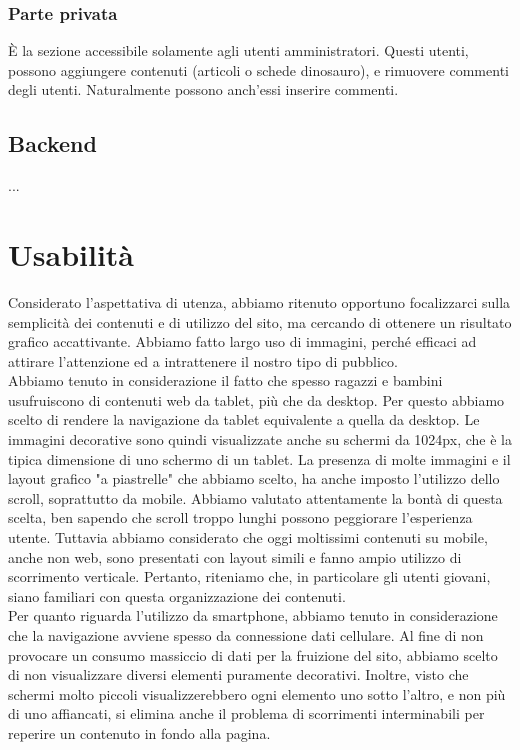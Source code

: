 \documentclass[12pt]{article}
\begin{document}
	\subsubsection{Parte privata}
	È la sezione accessibile solamente agli utenti amministratori. Questi utenti, possono aggiungere contenuti (articoli o schede dinosauro), e rimuovere commenti degli utenti. Naturalmente possono anch'essi inserire commenti.
	
	\subsection{Backend}
	...
	
	
	
	\section{Usabilità}
	Considerato l'aspettativa di utenza, abbiamo ritenuto opportuno focalizzarci sulla semplicità dei contenuti e di utilizzo del sito, ma cercando di ottenere un risultato grafico accattivante. Abbiamo fatto largo uso di immagini, perché efficaci ad attirare l'attenzione ed a intrattenere il nostro tipo di pubblico.\\
	Abbiamo tenuto in considerazione il fatto che spesso ragazzi e bambini usufruiscono di contenuti web da tablet, più che da desktop. Per questo abbiamo scelto di rendere la navigazione da tablet equivalente a quella da desktop. Le immagini decorative sono quindi visualizzate anche su schermi da 1024px, che è la tipica dimensione di uno schermo di un tablet.
	La presenza di molte immagini e il layout grafico "a piastrelle" che abbiamo scelto, ha anche imposto l'utilizzo dello scroll, soprattutto da mobile. Abbiamo valutato attentamente la bontà di questa scelta, ben sapendo che scroll troppo lunghi possono peggiorare l'esperienza utente. Tuttavia abbiamo considerato che oggi moltissimi contenuti su mobile, anche non web, sono presentati con layout simili e fanno ampio utilizzo di scorrimento verticale. Pertanto, riteniamo che, in particolare gli utenti giovani, siano familiari con questa organizzazione dei contenuti. \\
	Per quanto riguarda l'utilizzo da smartphone, abbiamo tenuto in considerazione che la navigazione avviene spesso da connessione dati cellulare. Al fine di non provocare un consumo massiccio di dati per la fruizione del sito, abbiamo scelto di non visualizzare diversi elementi puramente decorativi. Inoltre, visto che schermi molto piccoli visualizzerebbero ogni elemento uno sotto l'altro, e non più di uno affiancati, si elimina anche il problema di scorrimenti interminabili per reperire un contenuto in fondo alla pagina.\\
	
\end{document}
